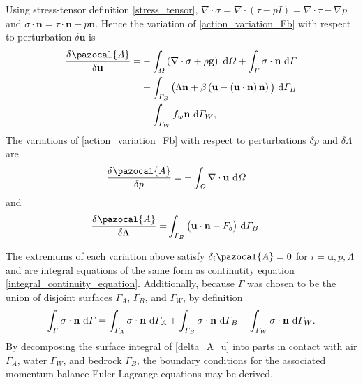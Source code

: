 Using stress-tensor definition \cref{stress_tensor}, $\nabla \cdot \sigma = \nabla \cdot \left( \tau - p I \right) = \nabla \cdot \tau - \nabla p$ and $\sigma \cdot \mathbf{n} = \tau \cdot \mathbf{n} - p \mathbf{n}$.  Hence the variation of \cref{action_variation_Fb} with respect to perturbation $\delta \mathbf{u}$ is
\begin{align}
  \label{delta_A_u}
  \delder{\pazocal{A}}{\mathbf{u}} = 
  &- \int_{\Omega} \left( \nabla \cdot \sigma + \rho \mathbf{g} \right) \d{\Omega}
   + \int_{\Gamma} \sigma \cdot \mathbf{n} \d{\Gamma} \notag \\
  &+ \int_{\Gamma_B} \big( \Lambda \mathbf{n} + \beta \left( \mathbf{u} - \left( \mathbf{u} \cdot \mathbf{n} \right) \mathbf{n} \right) \big) \d{\Gamma_B} \notag \\
  &+ \int_{\Gamma_W} f_w \mathbf{n} \d{\Gamma_W},
\end{align}
The variations of \cref{action_variation_Fb} with respect to perturbations $\delta p$ and $\delta \Lambda$ are
\begin{align}
  \label{delta_A_p}
  \delder{\pazocal{A}}{p} =
  &- \int_{\Omega} \nabla \cdot \mathbf{u} \d{\Omega}
\end{align}
and
\begin{align}
  \label{delta_A_Lambda}
  \delder{\pazocal{A}}{\Lambda} =
  & \int_{\Gamma_B} \big( \mathbf{u} \cdot \mathbf{n} - F_b \big) \d{\Gamma_B}.
\end{align}

The extremums of each variation above satisfy $\delta_i \pazocal{A} = 0$ for $i = \mathbf{u}, p, \Lambda$ and are integral equations of the same form as continutity equation \cref{integral_continuity_equation}.
Additionally, because $\Gamma$ was chosen to be the union of disjoint surfaces $\Gamma_A$, $\Gamma_B$, and $\Gamma_W$, by definition
\begin{align}
  \label{surface_stress_balance}
  \int_{\varGamma} \sigma \cdot \mathbf{n} \ \mathrm{d}\varGamma = \int_{\varGamma_A} \sigma \cdot \mathbf{n} \ \mathrm{d}\varGamma_A + \int_{\varGamma_B} \sigma \cdot \mathbf{n} \ \mathrm{d}\varGamma_B + \int_{\varGamma_W} \sigma \cdot \mathbf{n} \ \mathrm{d}\varGamma_W.
\end{align}
By decomposing the surface integral of \cref{delta_A_u} into parts in contact with air $\Gamma_A$, water $\Gamma_W$, and bedrock $\Gamma_B$, the boundary conditions for the associated momentum-balance Euler-Lagrange equations may be derived.

